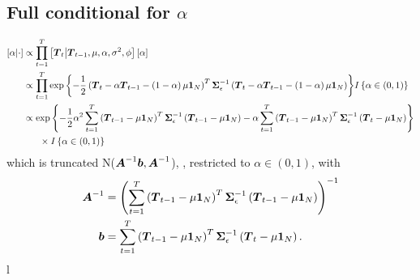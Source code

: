 \documentclass{article}\usepackage[]{graphicx}\usepackage[]{color}
\def\bm#1{\mbox{\boldmath $#1$}}
\begin{document}
\subsection{Full conditional for $\alpha$}
%
\begin{align*}
%
\left[ \alpha \middle| \cdot \right] & \propto \prod_{t = 1}^T \left[ \bm{T}_t \middle| \bm{T}_{t - 1}, \mu, \alpha, \sigma^2, \phi \right] \left[ \alpha \right]\\
%
& \propto \prod_{t = 1}^T \exp{ \left\{ - \frac{1} {2} \left( \bm{T}_t  - \alpha \bm{T}_{t - 1} - \left( 1 - \alpha \right) \mu \bm{1}_N \right)^T \bm{\Sigma}_\epsilon^{ - 1} \left( \bm{T}_t  - \alpha \bm{T}_{t - 1} - \left( 1 - \alpha \right) \mu \bm{1}_N \right) \right\} } I \left\{ \alpha \in \left( 0, 1 \right) \right\}\\
%
& \propto \exp{ \left\{ - \frac{1} {2} \alpha^2 \sum_{t = 1}^T \left( \bm{T}_{t - 1} - \mu \bm{1}_N \right)^T \bm{\Sigma}_\epsilon^{ - 1} \left( \bm{T}_{t - 1} - \mu \bm{1}_N \right) - \alpha \sum_{t = 1}^T \left( \bm{T}_{t - 1} - \mu \bm{1}_N \right)^T \bm{\Sigma}_\epsilon^{ - 1} \left( \bm{T}_t - \mu \bm{1}_N \right) \right\} } \\
& \hspace{6mm} \times I \left\{ \alpha \in \left( 0, 1 \right) \right\}\\
%
\end{align*}
%
which is truncated N($\bm{A}^{ - 1}\bm{b}, \bm{A}^{ - 1}$), , restricted to $\alpha \in \left( 0, 1 \right)$,  with \\
\begin{align*}
%
\bm{A}^{ - 1} & = \left( \sum_{t = 1}^T \left( \bm{T}_{t - 1} - \mu \bm{1}_N \right)^T \bm{\Sigma}_\epsilon^{ - 1} \left( \bm{T}_{t - 1} - \mu \bm{1}_N \right) \right)^{ - 1}\\
%
\bm{b} & = \sum_{t = 1}^T \left( \bm{T}_{t - 1} - \mu \bm{1}_N \right)^T \bm{\Sigma}_\epsilon^{ - 1} \left( \bm{T}_t - \mu \bm{1}_N \right) .
%
\end{align*}l
%
%
\end{document}
